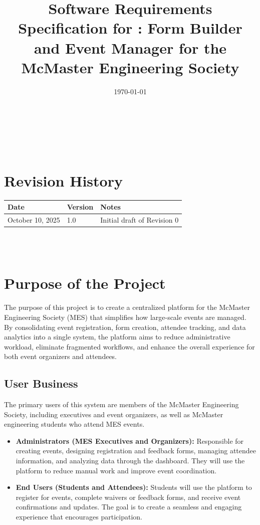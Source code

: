 \documentclass[12pt]{article}
\begin{document}
\title{Software Requirements Specification for \progname: Form Builder and Event Manager for the McMaster Engineering Society}
\author{\authname}
\date{\today}

\maketitle
~\newpage


\tableofcontents

~\newpage

\section*{Revision History}

\begin{tabularx}{\textwidth}{p{3cm}p{2cm}X}
\toprule {\textbf{Date}} & {\textbf{Version}} & {\textbf{Notes}}\\
\midrule
October 10, 2025 & 1.0 & Initial draft of Revision 0 \\
\bottomrule
\end{tabularx}

~\\

~\newpage

\section{Purpose of the Project}

The purpose of this project is to create a centralized platform for the McMaster Engineering Society (MES) that simplifies how large-scale events are managed. By consolidating event registration, form creation, attendee tracking, and data analytics into a single system, the platform aims to reduce administrative workload, eliminate fragmented workflows, and enhance the overall experience for both event organizers and attendees.

\subsection{User Business}

The primary users of this system are members of the McMaster Engineering Society, including executives and event organizers, as well as McMaster engineering students who attend MES events.  

\begin{itemize}
    \item \textbf{Administrators (MES Executives and Organizers):} Responsible for creating events, designing registration and feedback forms, managing attendee information, and analyzing data through the dashboard. They will use the platform to reduce manual work and improve event coordination.
    \item \textbf{End Users (Students and Attendees):} Students will use the platform to register for events, complete waivers or feedback forms, and receive event confirmations and updates. The goal is to create a seamless and engaging experience that encourages participation.
\end{itemize}
\end{document}
